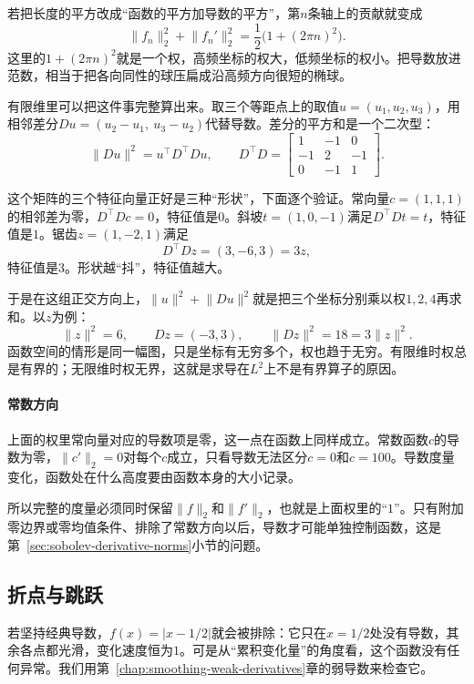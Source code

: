 若把长度的平方改成“函数的平方加导数的平方”，第$n$条轴上的贡献就变成
\[
\lVert f_n\rVert_2^2+\lVert f_n'\rVert_2^2
=\frac12\bigl(1+(2\pi n)^2\bigr).
\]
这里的$1+(2\pi n)^2$就是一个权，高频坐标的权大，低频坐标的权小。把导数放进范数，相当于把各向同性的球压扁成沿高频方向很短的椭球。

有限维里可以把这件事完整算出来。取三个等距点上的取值$u=(u_1,u_2,u_3)$，用相邻差分$Du=(u_2-u_1,\ u_3-u_2)$代替导数。差分的平方和是一个二次型：
\[
\lVert Du\rVert^2=u^\top D^\top Du,\qquad
D^\top D=\begin{bmatrix}1&-1&0\\-1&2&-1\\0&-1&1\end{bmatrix}.
\]

这个矩阵的三个特征向量正好是三种“形状”，下面逐个验证。常向量$c=(1,1,1)$的相邻差为零，$D^\top Dc=0$，特征值是$0$。斜坡$t=(1,0,-1)$满足$D^\top Dt=t$，特征值是$1$。锯齿$z=(1,-2,1)$满足
\[
D^\top Dz=(3,-6,3)=3z,
\]
特征值是$3$。形状越“抖”，特征值越大。

于是在这组正交方向上，$\lVert u\rVert^2+\lVert Du\rVert^2$就是把三个坐标分别乘以权$1,2,4$再求和。以$z$为例：
\[
\lVert z\rVert^2=6,\qquad Dz=(-3,3),\qquad \lVert Dz\rVert^2=18=3\lVert z\rVert^2.
\]
函数空间的情形是同一幅图，只是坐标有无穷多个，权也趋于无穷。有限维时权总是有界的；无限维时权无界，这就是求导在$L^2$上不是有界算子的原因。

\paragraph{常数方向}
上面的权里常向量对应的导数项是零，这一点在函数上同样成立。常数函数$c$的导数为零，$\lVert c'\rVert_2=0$对每个$c$成立，只看导数无法区分$c=0$和$c=100$。导数度量变化，函数处在什么高度要由函数本身的大小记录。

所以完整的度量必须同时保留$\lVert f\rVert_2$和$\lVert f'\rVert_2$，也就是上面权里的“$1$”。只有附加零边界或零均值条件、排除了常数方向以后，导数才可能单独控制函数，这是第~\ref{sec:sobolev-derivative-norms}小节的问题。

\subsection{折点与跳跃}
\label{sec:sobolev-kinks-jumps}

若坚持经典导数，$f(x)=|x-1/2|$就会被排除：它只在$x=1/2$处没有导数，其余各点都光滑，变化速度恒为$1$。可是从“累积变化量”的角度看，这个函数没有任何异常。我们用第~\ref{chap:smoothing-weak-derivatives}章的弱导数来检查它。

